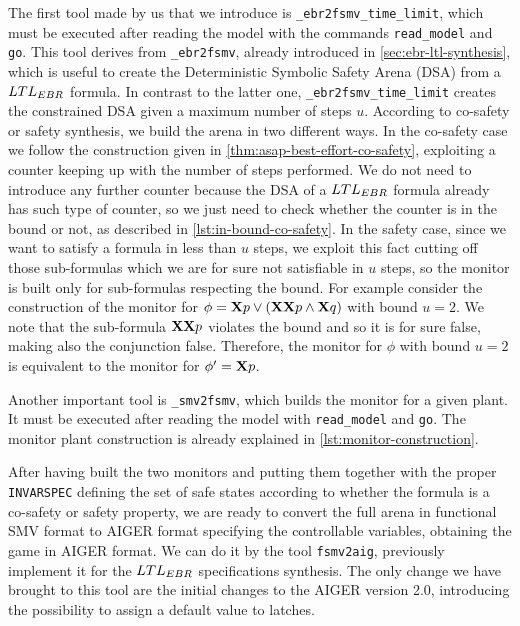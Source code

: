 The first tool made by us that we introduce is \lstinline{_ebr2fsmv_time_limit}, which must be executed after reading the model with the commands \lstinline{read_model} and \lstinline{go}.
This tool derives from \lstinline{_ebr2fsmv}, already introduced in \autoref{sec:ebr-ltl-synthesis}, which is useful to create the Deterministic Symbolic Safety Arena (DSA) from a $LTL_{EBR}$ formula.
In contrast to the latter one, \lstinline{_ebr2fsmv_time_limit} creates the constrained DSA given a maximum number of steps $u$.
According to co-safety or safety synthesis, we build the arena in two different ways.
In the co-safety case we follow the construction given in \autoref{thm:asap-best-effort-co-safety}, exploiting a counter keeping up with the number of steps performed.
We do not need to introduce any further counter because the DSA of a $LTL_{EBR}$ formula already has such type of counter, so we just need to check whether the counter is in the bound or not, as described in \autoref{lst:in-bound-co-safety}.
In the safety case, since we want to satisfy a formula in less than $u$ steps, we exploit this fact cutting off those sub-formulas which we are for sure not satisfiable in $u$ steps, so the monitor is built only for sub-formulas respecting the bound.
For example consider the construction of the monitor for $\phi = \mathbf{X} p \lor (\mathbf{X} \mathbf{X} p \land \mathbf{X} q)$ with bound $u = 2$. 
We note that the sub-formula $\mathbf{X} \mathbf{X} p$ violates the bound and so it is for sure false, making also the conjunction false.
Therefore, the monitor for $\phi$ with bound $u=2$ is equivalent to the monitor for $\phi' = \mathbf{X} p$.

Another important tool is \lstinline{_smv2fsmv}, which builds the monitor for a given plant.
It must be executed after reading the model with \lstinline{read_model} and \lstinline{go}.
The monitor plant construction is already explained in \autoref{lst:monitor-construction}.

After having built the two monitors and putting them together with the proper \lstinline{INVARSPEC} defining the set of safe states according to whether the formula is a co-safety or safety property, we are ready to convert the full arena in functional SMV format to AIGER format specifying the controllable variables, obtaining the game in AIGER format.
We can do it by the tool \lstinline{fsmv2aig}, previously implement it for the $LTL_{EBR}$ specifications synthesis.
The only change we have brought to this tool are the initial changes to the AIGER version 2.0, introducing the possibility to assign a default value to latches.


